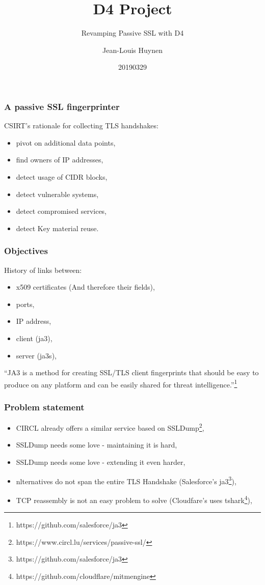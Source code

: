 \documentclass{beamer}
\title{D4 Project}
\subtitle{Revamping Passive SSL with D4}
\author{Jean-Louis Huynen}
\institute{Team CIRCL \\ \url{https://www.d4-project.org/}}
\date{20190329}
\begin{document}
\begin{frame}
    \maketitle
\end{frame}
       
\begin{frame}
        \frametitle{A passive SSL fingerprinter}
        CSIRT's rationale for collecting TLS handshakes:
        \begin{itemize}
          \item pivot on additional data points,
          \item find owners of IP addresses,
          \item detect usage of CIDR blocks,
          \item detect vulnerable systems,
          \item detect compromised services,
          \item detect Key material reuse.
        \end{itemize}
\end{frame}

\begin{frame}
  \frametitle{Objectives}

        History of links between:
        \begin{itemize}
          \item x509 certificates (And therefore their fields),
          \item ports,
          \item IP address,
          \item client (ja3),
          \item server (ja3s),
        \end{itemize}
        \begin{displayquote}
        ``JA3 is a method for creating SSL/TLS client fingerprints that should be easy to produce on any platform and can be easily shared for threat intelligence.''\footnote{https://github.com/salesforce/ja3}
        \end{displayquote}
\end{frame}
 
\begin{frame}
        \frametitle{Problem statement}
        \begin{itemize}
          \item CIRCL already offers a similar service based on SSLDump\footnote{https://www.circl.lu/services/passive-ssl/},
          \item SSLDump needs some love - maintaining it is hard,
          \item SSLDump needs some love - extending it even harder,
          \item nlternatives do not span the entire TLS Handshake (Salesforce's
            ja3\footnote{https://github.com/salesforce/ja3}),
          \item TCP reassembly is not an easy problem to solve (Cloudfare's uses tshark\footnote{https://github.com/cloudflare/mitmengine}),
        \end{itemize}
\end{frame}
\end{document}
